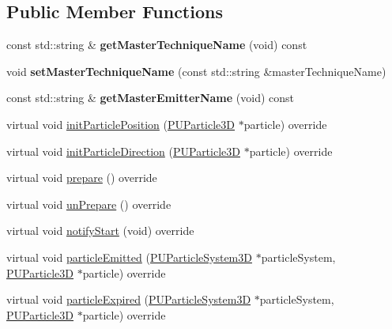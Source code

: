 \subsection*{Public Member Functions}
\begin{DoxyCompactItemize}
\item 
\mbox{\label{classPUSlaveEmitter_aaaa188c03b42dcdbc5d66c420e918d68}} 
const std\+::string \& {\bfseries get\+Master\+Technique\+Name} (void) const
\item 
\mbox{\label{classPUSlaveEmitter_abd0d9badc52214ba48523982bb89feb6}} 
void {\bfseries set\+Master\+Technique\+Name} (const std\+::string \&master\+Technique\+Name)
\item 
\mbox{\label{classPUSlaveEmitter_a11963c5a979e6dfc423e755888d47da4}} 
const std\+::string \& {\bfseries get\+Master\+Emitter\+Name} (void) const
\item 
virtual void \hyperlink{classPUSlaveEmitter_a91be8151129e78b9a1a06a67ff67c640}{init\+Particle\+Position} (\hyperlink{structPUParticle3D}{P\+U\+Particle3D} $\ast$particle) override
\item 
virtual void \hyperlink{classPUSlaveEmitter_ae52196734cc114bcd5293f9489c167ba}{init\+Particle\+Direction} (\hyperlink{structPUParticle3D}{P\+U\+Particle3D} $\ast$particle) override
\item 
virtual void \hyperlink{classPUSlaveEmitter_aa7bce7be375ca983b9f599f74e55dcb8}{prepare} () override
\item 
virtual void \hyperlink{classPUSlaveEmitter_af94b7ad7d1c2e9c567ab42a25a9f8db3}{un\+Prepare} () override
\item 
virtual void \hyperlink{classPUSlaveEmitter_a9f518377b3215049adc9708686f62217}{notify\+Start} (void) override
\item 
virtual void \hyperlink{classPUSlaveEmitter_acdfc2f0ae29f95c260d1d34afdf7fa61}{particle\+Emitted} (\hyperlink{classPUParticleSystem3D}{P\+U\+Particle\+System3D} $\ast$particle\+System, \hyperlink{structPUParticle3D}{P\+U\+Particle3D} $\ast$particle) override
\item 
virtual void \hyperlink{classPUSlaveEmitter_afde1c15d1638e0ab37c93c4337e210a5}{particle\+Expired} (\hyperlink{classPUParticleSystem3D}{P\+U\+Particle\+System3D} $\ast$particle\+System, \hyperlink{structPUParticle3D}{P\+U\+Particle3D} $\ast$particle) override
\item 

\end{DoxyCompactItemize}
